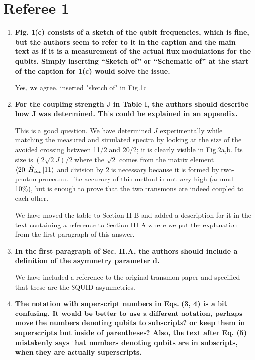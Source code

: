 \documentclass{article}
\begin{document}
\section{Referee 1}

\begin{enumerate}
\item \textbf{Fig. 1(c) consists of a sketch of the qubit frequencies, which is
	fine, but the authors seem to refer to it in the caption and the main
	text as if it is a measurement of the actual flux modulations for the
	qubits. Simply inserting “Sketch of” or “Schematic of” at the start of
	the caption for 1(c) would solve the issue.} 

Yes, we agree, inserted "sketch of" in Fig.1c

\item \textbf{For the coupling strength J in Table I, the authors should describe
	how J was determined. This could be explained in an appendix.}

This is a good question. We have determined $J$ experimentally while matching the measured and simulated spectra by looking at the size of the avoided crossing between 11/2 and 20/2; it is clearly visible in Fig.2a,b. Its size is $(2\sqrt{2} J)/2$ where the $\sqrt{2}$ comes from the matrix element $\bra{20}\hat H_{int}\ket{11}$ and division by 2 is necessary because it is formed by two-photon processes. The accuracy of this method is not very high (around 10\%), but is enough to prove that the two transmons are indeed coupled to each other. 

We have moved the table to Section II B and added a description for it in the text containing a reference to Section III A where we put the explanation from the first paragraph of this answer.

\item \textbf{In the first paragraph of Sec. II.A, the authors should include a
	definition of the asymmetry parameter d.}

We have included a reference to the original transmon paper and specified that these are the SQUID asymmetries.

\item \textbf{The notation with superscript numbers in Eqs. (3, 4) is a bit
	confusing. It would be better to use a different notation, perhaps
	move the numbers denoting qubits to subscripts? or keep them in
	superscripts but inside of parentheses? Also, the text after Eq. (5)
	mistakenly says that numbers denoting qubits are in subscripts, when
	they are actually superscripts.}


\end{enumerate}
\end{document}
